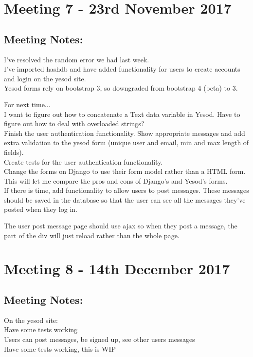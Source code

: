 \documentclass[a4paper,11pt]{article}
\begin{document}
\section{Meeting 7 - 23rd November 2017}

\subsection{Meeting Notes:}

I’ve resolved the random error we had last week.\\
I’ve imported hashdb and have added functionality for users to create accounts and login on the yesod site.\\
Yesod forms rely on bootstrap 3, so downgraded from bootstrap 4 (beta) to 3.

For next time...\\
I want to figure out how to concatenate a Text data variable in Yesod. Have to figure out how to deal with overloaded strings?\\
Finish the user authentication functionality. Show appropriate messages and add extra validation to the yesod form (unique user and email, min and max length of fields).\\
Create tests for the user authentication functionality.\\
Change the forms on Django to use their form model rather than a HTML form. This will let me compare the pros and cons of Django’s and Yesod’s forms.\\
If there is time, add functionality to allow users to post messages. These messages should be saved in the database so that the user can see all the messages they’ve posted when they log in.

The user post message page should use ajax so when they post a message, the part of the div will just reload rather than the whole page.

\section{Meeting 8 - 14th December 2017}

\subsection{Meeting Notes:}
On the yesod site:\\
Have some tests working\\
Users can post messages, be signed up, see other users messages\\
Have some tests working, this is WIP\\
\end{document}
